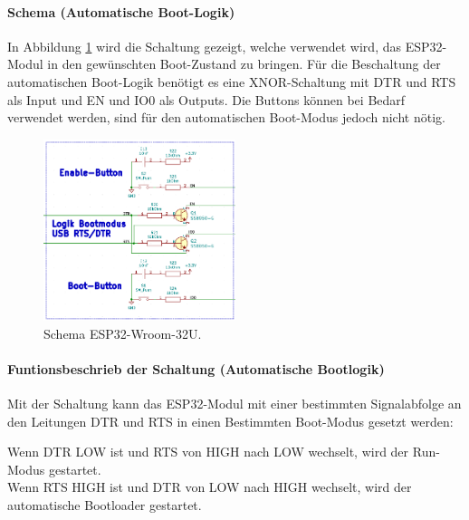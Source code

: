 \paragraph{Schema (Automatische Boot-Logik)}\mbox{}

In Abbildung \ref{fig:Schema_ESP32_Flashbuttons} wird die Schaltung gezeigt, welche verwendet wird, das ESP32-Modul in den gewünschten Boot-Zustand zu bringen. Für die Beschaltung der automatischen Boot-Logik benötigt es eine XNOR-Schaltung mit DTR und RTS als Input und EN und IO0 als Outputs. Die Buttons können bei Bedarf verwendet werden, sind für den automatischen Boot-Modus jedoch nicht nötig.

\begin{figure}[h!]
	\centering
	\includegraphics[width=0.5\textwidth]{graphics/Schema_ESP32_Flashbuttons}
	\caption{Schema ESP32-Wroom-32U.}
	\label{fig:Schema_ESP32_Flashbuttons}
\end{figure}

\paragraph{Funtionsbeschrieb der Schaltung (Automatische Bootlogik)}\mbox{}

Mit der Schaltung kann das ESP32-Modul mit einer bestimmten Signalabfolge an den Leitungen DTR und RTS in einen Bestimmten Boot-Modus gesetzt werden:

Wenn DTR LOW ist und RTS von HIGH nach LOW wechselt, wird der Run-Modus gestartet.\\
Wenn RTS HIGH ist und DTR von LOW nach HIGH wechselt, wird der automatische Bootloader gestartet.




\newpage



